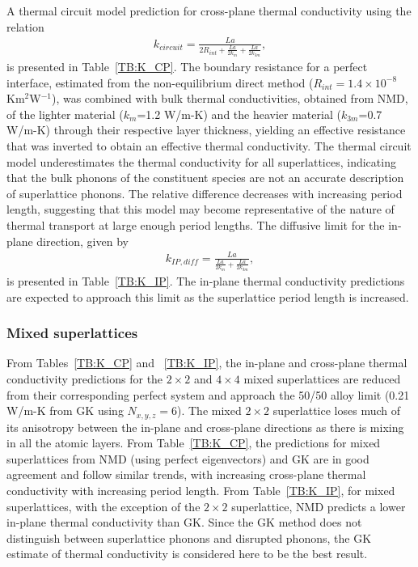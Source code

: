 \documentclass[aps,prb,preprint,preprintnumbers,amsmath,amssymb,floatfix,superscriptaddress]{revtex4}
\begin{document}
A thermal circuit model prediction for cross-plane thermal conductivity using the relation\cite{PhysRevB.77.184302}
\begin{equation}\label{EQ:TCircuit}
\begin{split}
k_{circuit}= \frac{La}{2R_{int}+\frac{La}{2k_m}+\frac{La}{2k_{3m}}},
\end{split}
\end{equation}
is presented in Table~\ref{TB:K_CP}. The boundary resistance for a perfect interface, estimated from the non-equilibrium direct method ($R_{int}=1.4\times10^{-8}$ Km$^2$W$^{-1}$), was combined with bulk thermal conductivities, obtained from NMD, of the lighter material ($k_{m}$=1.2 W/m-K) and the heavier material ($k_{3m}$=0.7 W/m-K) through their respective layer thickness, yielding an effective resistance that was inverted to obtain an effective thermal conductivity. The thermal circuit model underestimates the thermal conductivity for all superlattices, indicating that the bulk phonons of the constituent species are not an accurate description of superlattice phonons. The relative difference decreases with increasing period length, suggesting that this model may become representative of the nature of thermal transport at large enough period lengths.
The diffusive limit for the in-plane direction, given by \cite{PhysRevB.77.184302}
\begin{equation}\label{EQ:TCircuit}
\begin{split}
k_{IP,diff}= \frac{La}{\frac{La}{2k_m}+\frac{La}{2k_{3m}}},
\end{split}
\end{equation}
is presented in Table~\ref{TB:K_IP}. The in-plane thermal conductivity predictions are expected to approach this limit as the superlattice period length is increased.
\subsubsection{Mixed superlattices}
From Tables~\ref{TB:K_CP} and ~\ref{TB:K_IP}, the in-plane and cross-plane thermal conductivity predictions for the $2\times 2$ and $4\times 4$ mixed superlattices are reduced from their corresponding perfect system and approach the 50/50 alloy limit (0.21 W/m-K from GK using $N_{x,y,z}=6$). The mixed $2\times 2$ superlattice loses much of its anisotropy between the in-plane and cross-plane directions as there is mixing in all the atomic layers. From Table~\ref{TB:K_CP}, the predictions for mixed superlattices from NMD (using perfect eigenvectors) and GK are in good agreement and follow similar trends, with increasing cross-plane thermal conductivity with increasing period length. From Table~\ref{TB:K_IP}, for mixed superlattices, with the exception of  the $2 \times 2$ superlattice, NMD predicts a lower in-plane thermal conductivity than GK. Since the GK method does not distinguish between superlattice phonons and disrupted phonons, the GK estimate of thermal conductivity is considered here to be the best result. 
\end{document}
